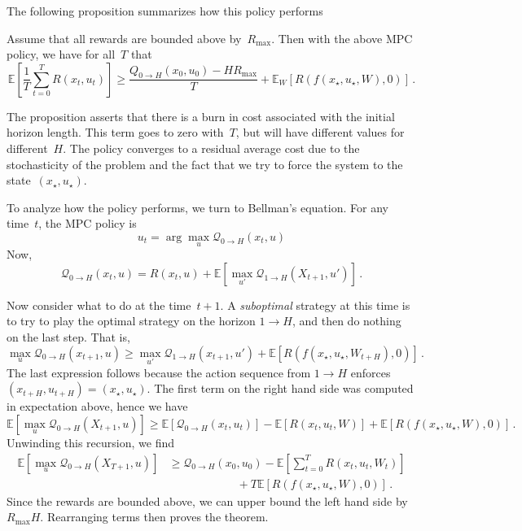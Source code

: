\documentclass{tufte-book}
\begin{document}
The following proposition summarizes how this policy performs

\begin{Proposition}

Assume that all rewards are bounded above by~\(R_{\mathrm{max}}\). Then
with the above MPC policy, we have for all~\(T\) that \[
 \mathbb{E}\left[ \frac{1}{T} \sum_{t=0}^T R(x_t,u_t)\right] \geq \frac{Q_{0\rightarrow H}(x_0,u_0)-H R_{\mathrm{max}}}{T}
 + \mathbb{E}_W[R(f(x_\star,u_\star,W),0)]\,.
\]

\end{Proposition}

The proposition asserts that there is a burn in cost associated with the
initial horizon length. This term goes to zero with~\(T\), but will have
different values for different~\(H\). The policy converges to a residual
average cost due to the stochasticity of the problem and the fact that
we try to force the system to the state~\((x_\star,u_\star)\).

\begin{Proof}

To analyze how the policy performs, we turn to Bellman's equation. For
any time~\(t\), the MPC policy is \[
    u_t = \arg\max_u \mathcal{Q}_{0\rightarrow H}(x_t,u)
\] Now, \[
    \mathcal{Q}_{0\rightarrow H}(x_t,u) = R(x_t,u) + \mathbb{E}[\max_{u'} \mathcal{Q}_{1\rightarrow H}(X_{t+1},u')]\,.
\]

Now consider what to do at the time~\(t+1\). A \emph{suboptimal}
strategy at this time is to try to play the optimal strategy on the
horizon \(1\rightarrow H\), and then do nothing on the last step. That
is, \[
\max_u \mathcal{Q}_{0\rightarrow H}(x_{t+1},u) \geq
                 \max_{u'} \mathcal{Q}_{1\rightarrow H}(x_{t+1},u') + \mathbb{E}[R(f(x_\star,u_\star,W_{t+H}),0)]\,.
\] The last expression follows because the action sequence from
\(1\rightarrow H\) enforces~\((x_{t+H},u_{t+H})=(x_\star,u_\star)\). The
first term on the right hand side was computed in expectation above,
hence we have \[
\mathbb{E}[\max_u \mathcal{Q}_{0\rightarrow H}(X_{t+1},u)] \geq
    \mathbb{E}[\mathcal{Q}_{0\rightarrow H}(x_t,u_t)] - \mathbb{E}[R(x_t,u_t,W)] + \mathbb{E}[R(f(x_\star,u_\star,W),0)] \,.
\] Unwinding this recursion, we find \[
\begin{aligned}
\mathbb{E}[\max_u \mathcal{Q}_{0\rightarrow H}(X_{T+1},u)] &\geq
    \mathcal{Q}_{0\rightarrow H}(x_0,u_0) - \mathbb{E}\left[\sum_{t=0}^T R(x_t,u_t,W_t)\right]\\
    &\qquad\qquad\qquad  + T \mathbb{E}[R(f(x_\star,u_\star,W),0)] \,.
    \end{aligned}
\] Since the rewards are bounded above, we can upper bound the left hand
side by~\(R_{\mathrm{max}} H\). Rearranging terms then proves the
theorem.

\end{Proof}
\end{document}
